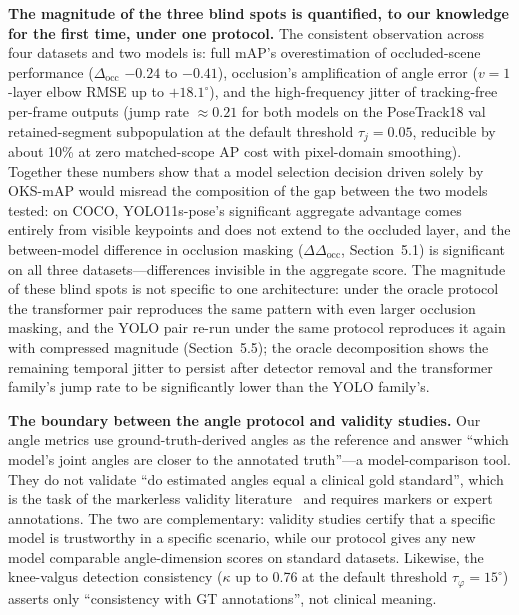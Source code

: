 \documentclass[10pt,conference]{IEEEtran}
\begin{document}
\textbf{The magnitude of the three blind spots is quantified, to our knowledge for the first time, under one protocol.} The consistent observation across four datasets and two models is: full mAP's overestimation of occluded-scene performance ($\Delta_{\mathrm{occ}}$ $-0.24$ to $-0.41$), occlusion's amplification of angle error ($v{=}1$-layer elbow RMSE up to $+18.1^{\circ}$), and the high-frequency jitter of tracking-free per-frame outputs (jump rate $\approx0.21$ for both models on the PoseTrack18 val retained-segment subpopulation at the default threshold $\tau_j=0.05$, reducible by about 10\% at zero matched-scope AP cost with pixel-domain smoothing). Together these numbers show that a model selection decision driven solely by OKS-mAP would misread the composition of the gap between the two models tested: on COCO, YOLO11s-pose's significant aggregate advantage comes entirely from visible keypoints and does not extend to the occluded layer, and the between-model difference in occlusion masking ($\Delta\Delta_{\mathrm{occ}}$, Section~5.1) is significant on all three datasets---differences invisible in the aggregate score. The magnitude of these blind spots is not specific to one architecture: under the oracle protocol the transformer pair reproduces the same pattern with even larger occlusion masking, and the YOLO pair re-run under the same protocol reproduces it again with compressed magnitude (Section~5.5); the oracle decomposition shows the remaining temporal jitter to persist after detector removal and the transformer family's jump rate to be significantly lower than the YOLO family's.

\textbf{The boundary between the angle protocol and validity studies.} Our angle metrics use ground-truth-derived angles as the reference and answer ``which model's joint angles are closer to the annotated truth''---a model-comparison tool. They do not validate ``do estimated angles equal a clinical gold standard'', which is the task of the markerless validity literature~\cite{4,5,6} and requires markers or expert annotations. The two are complementary: validity studies certify that a specific model is trustworthy in a specific scenario, while our protocol gives any new model comparable angle-dimension scores on standard datasets. Likewise, the knee-valgus detection consistency ($\kappa$ up to 0.76 at the default threshold $\tau_\varphi{=}15^{\circ}$) asserts only ``consistency with GT annotations'', not clinical meaning.
\end{document}
